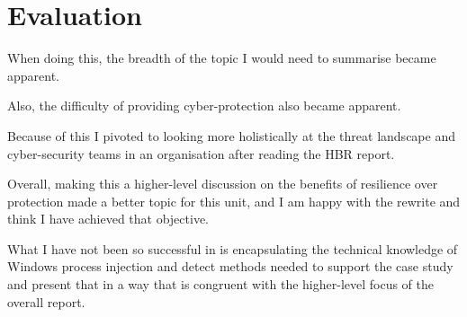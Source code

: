 \section{Evaluation}


When doing this, the breadth of the topic I would need to summarise became apparent. 

Also, the difficulty of providing cyber-protection also became apparent. 
  

Because of this I pivoted to looking more holistically at the threat landscape and cyber-security teams in an organisation after reading  the HBR report. 

Overall, making this a higher-level discussion on the benefits of resilience over protection made a better topic for this unit, and I am happy with the rewrite and think I have achieved that objective. 

What I have not been so successful in is encapsulating the technical knowledge of Windows process injection and detect methods needed to support the case study and present that in a way that is congruent with the higher-level focus of the overall report. 